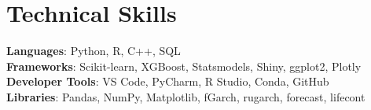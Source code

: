 \documentclass[letterpaper,11pt]{article}
\begin{document}
%
\section{Technical Skills}
 \begin{itemize}[leftmargin=0.15in, label={}]
    \small{\item{
     \textbf{Languages}{: Python, R, C++, SQL} \\
     \textbf{Frameworks}{: Scikit-learn, XGBoost, Statsmodels, Shiny, ggplot2, Plotly} \\
     \textbf{Developer Tools}{: VS Code, PyCharm, R Studio, Conda, GitHub} \\
     \textbf{Libraries}{: Pandas, NumPy, Matplotlib, fGarch, rugarch, forecast, lifecont }
    }}
 \end{itemize}


\end{document}
